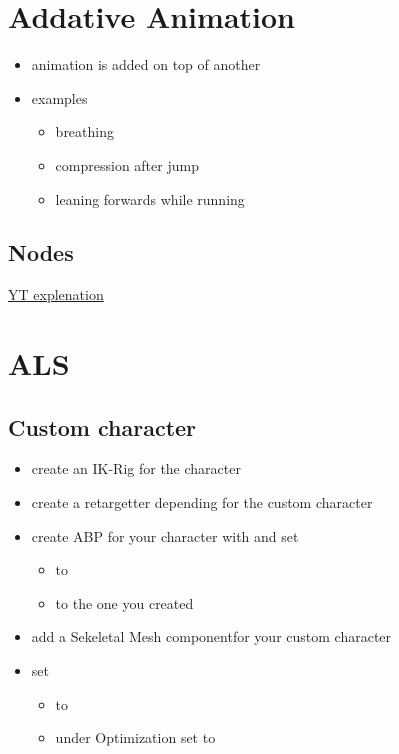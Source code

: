     \section{Addative Animation}
        \begin{itemize}
            \item animation is added on top of another
            \item examples
            \begin{itemize}
                \item breathing
                \item compression after jump
                \item leaning forwards while running
            \end{itemize}
        \end{itemize}
        
        \subsection{Nodes}

        
        \href{https://www.youtube.com/watch?v=flHL3qJB3_I}{YT explenation}

    \section{ALS}
        \subsection{Custom character}
            \begin{itemize}
                \item create an IK-Rig for the character
                \item create a retargetter depending for the custom character
                \item create ABP for your character with  and set
                \begin{itemize}
                    \item {} to 
                    \item {} to the one you created
                \end{itemize}
                \item add a \glqq Sekeletal Mesh component\grqq for your custom character
                \item set
                \begin{itemize}
                    \item {} to 
                    \item under Optimization set  to 
                \end{itemize}
                
            \end{itemize}

